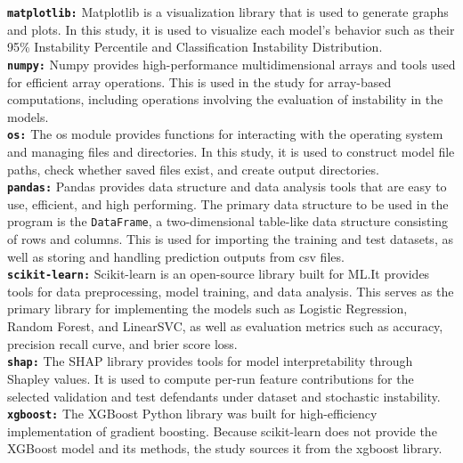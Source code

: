 \documentclass[12pt]{article}
\begin{document}
\textbf{\texttt{matplotlib:}} Matplotlib is a visualization library that is used to generate graphs and plots. In this study, it is used to visualize each model's behavior such as their 95\% Instability Percentile and Classification Instability Distribution.\\

\textbf{\texttt{numpy:}} Numpy provides high-performance multidimensional arrays and tools used for efficient array operations. This is used in the study for array-based computations, including operations involving the evaluation of instability in the models.\\

\textbf{\texttt{os:}} The os module provides functions for interacting with the operating system and managing files and directories. In this study, it is used to construct model file paths, check whether saved files exist, and create output directories.\\

\textbf{\texttt{pandas:}} Pandas provides data structure and data analysis tools that are easy to use, efficient, and high performing. The primary data structure to be used in the program is the \texttt{DataFrame}, a two-dimensional table-like data structure consisting of rows and columns. This is used for importing the training and test datasets, as well as storing and handling prediction outputs from csv files.\\

\textbf{\texttt{scikit-learn:}} Scikit-learn is an open-source library built for ML.\@ It provides tools for data preprocessing, model training, and data analysis. This serves as the primary library for implementing the models such as Logistic Regression, Random Forest, and LinearSVC, as well as evaluation metrics such as accuracy, precision recall curve, and brier score loss.\\

\textbf{\texttt{shap:}} The SHAP library provides tools for model interpretability through Shapley values. It is used to compute per-run feature contributions for the selected validation and test defendants under dataset and stochastic instability.\\

\textbf{\texttt{xgboost:}} The XGBoost Python library was built for high-efficiency implementation of gradient boosting. Because scikit-learn does not provide the XGBoost model and its methods, the study sources it from the xgboost library.\\
\end{document}
